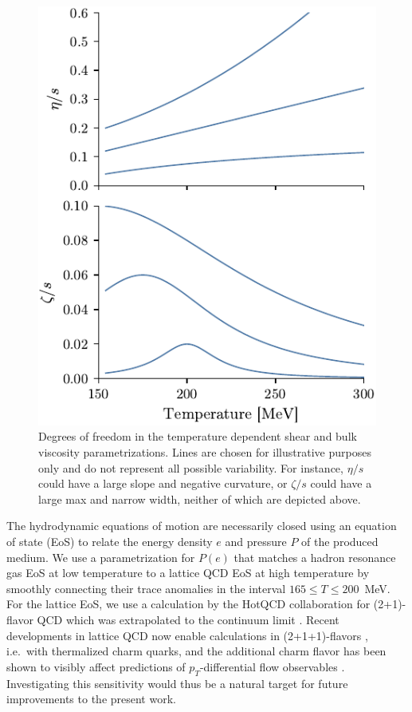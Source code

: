 \documentclass[aps,prc,reprint,amsmath,nofootinbib]{revtex4-1}
\begin{document}
\begin{figure}
  \centering
  \includegraphics{fig/viscosity_dof}
  \caption{\label{fig:viscosity_dof} Degrees of freedom in the temperature dependent shear and bulk viscosity parametrizations.
  Lines are chosen for illustrative purposes only and do not represent all possible variability.
  For instance, $\eta/s$ could have a large slope and negative curvature, or $\zeta/s$ could have a large max and narrow width, neither of which are depicted above.
}
\end{figure}

The hydrodynamic equations of motion are necessarily closed using an equation of state (EoS) to relate the energy density $e$ and pressure $P$ of the produced medium.
We use a parametrization for $P(e)$ that matches a hadron resonance gas EoS at low temperature to a lattice QCD EoS at high temperature by smoothly connecting their trace anomalies in the interval $165 \le T \le 200$~MeV.
For the lattice EoS, we use a calculation by the HotQCD collaboration for (2+1)-flavor QCD which was extrapolated to the continuum limit \cite{Bazavov:2014pvz}. Recent developments in lattice QCD now enable calculations in (2+1+1)-flavors \cite{Borsanyi:2016ksw}, i.e.\ with thermalized charm quarks, and the additional charm flavor has been shown to visibly affect predictions of $p_T$-differential flow observables \cite{Noronha-Hostler:2018zxc}.
Investigating this sensitivity would thus be a natural target for future improvements to the present work.
\end{document}

